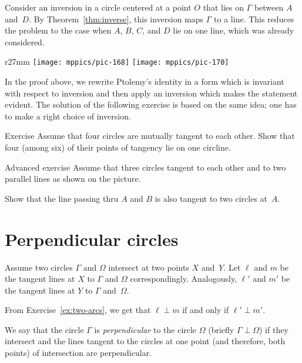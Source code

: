 Consider an inversion in a circle centered at a point $O$ that lies on $\Gamma$ between $A$ and~$D$.
By 
Theorem~\ref{thm:inverse},
this inversion maps $\Gamma$ to a line.
This reduces the problem to the case when $A$, $B$, $C$, and $D$ lie on one line, which was already considered.
\qeds

{

\begin{wrapfigure}{r}{27mm}
\vskip-4mm
\centering
\texttt{[image: mppics/pic-168]}
\vskip4mm
\texttt{[image: mppics/pic-170]}
\end{wrapfigure}


In the proof above, we rewrite Ptolemy's identity in a form which is invariant with respect to inversion 
and then apply an inversion which makes the statement evident.
The solution of the following exercise is based on the same idea;
one has to make a right choice of inversion.



\begin{thm}{Exercise}\label{ex:4-circles}
Assume that four circles are mutually tangent to each other.
Show that four (among six) of their points of tangency lie on one circline.
\end{thm}


\begin{thm}{Advanced exercise}\label{ex:inverse}
Assume that three circles tangent to each other and to two parallel lines as shown on the picture.

Show that the line passing thru $A$ and $B$ is also tangent to two circles at~$A$.
\end{thm}

}

\section*{Perpendicular circles}

Assume two circles $\Gamma$ and $\Omega$ intersect at two points $X$ and~$Y$.
Let $\ell$ and $m$ be the tangent lines at $X$ to $\Gamma$ and $\Omega$ correspondingly.
Analogously, $\ell'$ and $m'$ be the tangent lines at $Y$ to $\Gamma$ and~$\Omega$.

From Exercise~\ref{ex:two-arcs}, we get that  
 $\ell\perp m$ if and only if $\ell'\perp m'$.

We say that the circle $\Gamma$ is {}\emph{perpendicular} to the circle $\Omega$ 
(briefly $\Gamma\perp \Omega$)
if they intersect and the lines tangent to the circles at one point 
(and therefore, both points) 
of intersection are perpendicular.

